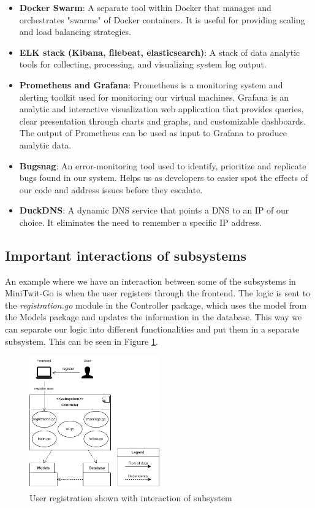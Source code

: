 \begin{itemize}
    \item \textbf{Docker Swarm}: A separate tool within Docker that manages and orchestrates "swarms" of Docker containers. It is useful for providing scaling and load balancing strategies.
    \item \textbf{ELK stack (Kibana, filebeat, elasticsearch)}: A stack of data analytic tools for collecting, processing, and visualizing system log output.
    \item \textbf{Prometheus and Grafana}: Prometheus is a monitoring system and alerting toolkit used for monitoring our virtual machines. Grafana is an analytic and interactive visualization web application that provides queries, clear presentation through charts and graphs, and customizable dashboards. The output of Prometheus can be used as input to Grafana to produce analytic data.
    \item \textbf{Bugsnag}: An error-monitoring tool used to identify, prioritize and replicate bugs found in our system. Helps us as developers to easier spot the effects of our code and address issues before they escalate.
    \item \textbf{DuckDNS}: A dynamic DNS service that points a DNS to an IP of our choice. It eliminates the need to remember a specific IP address.
\end{itemize}

\subsection{Important interactions of subsystems}   

An example where we have an interaction between some of the subsystems in MiniTwit-Go is when the user registers through the frontend. The logic is sent to the \textit{registration.go} module in the Controller package, which uses the model from the Models package and updates the information in the database. This way we can separate our logic into different functionalities and put them in a separate subsystem. This can be seen in Figure \ref{fig:subsysteminteraction}. 

\begin{figure}[ht]
		\centering
		\includegraphics[width=0.5\textwidth]{images/subsysteminteraction.png}
		\caption{User registration shown with interaction of subsystem}
		\label{fig:subsysteminteraction}
\end{figure}

